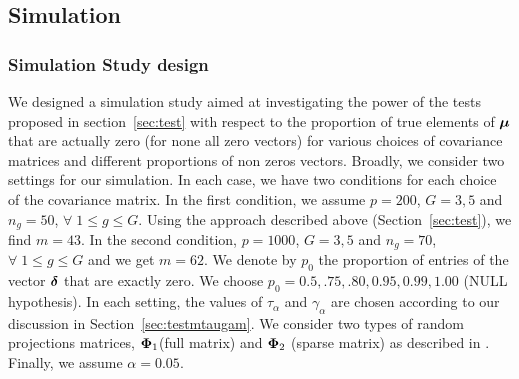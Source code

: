 \documentclass[12pt]{article}
\theoremstyle{plain}%
\theoremstyle{definition}
\newcommand{\udelta}            {\mbox{\boldmath$\delta$}}
\newcommand{\umu}               {\mbox{\boldmath$\mu$}}
\newcommand{\uPhi}              {\mbox{\boldmath$\Phi$}}
\begin{document}
\subsection{Simulation}

\subsubsection{Simulation Study design}
We designed a simulation study aimed at investigating the power of the tests proposed in section~\ref{sec:test}
with respect to the proportion of true elements of $\umu$ that are actually zero (for none all zero vectors) for various choices of covariance matrices and different proportions of non zeros vectors.
Broadly, we consider two settings for our simulation. In each case, we have two conditions for each choice of the covariance matrix. 
In the first condition, we assume $p = 200$, $G=3, 5$ and $n_g = 50$, $\forall\; 1 \leq g \leq G$. Using the approach described above (Section~\ref{sec:test}), we find $m = 43$.
In the second condition, $p = 1000$, $G=3, 5$ and $n_g = 70$, $\forall\; 1 \leq g \leq G$ and we get $m = 62$. We denote by $p_0$ the proportion of entries of the vector $\udelta$ that are exactly zero. We choose $p_0 = 0.5, .75, .80, 0.95, 0.99, 1.00$ (NULL hypothesis).
In each setting, the values of $\tau_{\alpha}$ and $\gamma_{\alpha}$ are chosen according to our discussion in Section~\ref{sec:testmtaugam}. We consider two types of random projections matrices, $\uPhi_{1}$(full matrix)  and $\uPhi_2$ (sparse matrix) as described in \citealp{srivastava2014raptt,zoh2018powerful}. Finally, we assume $\alpha = 0.05$.
\end{document}
